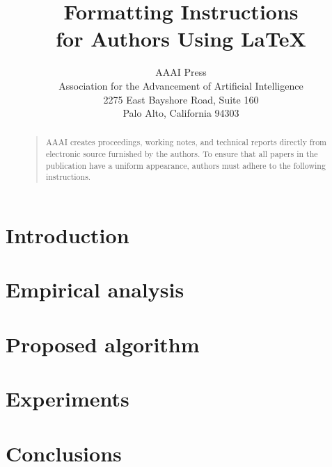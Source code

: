 \documentclass[letterpaper]{article}
\begin{document}
%
\title{Formatting Instructions \\for Authors Using \LaTeX{}}
\author{AAAI Press\\
Association for the Advancement of Artificial Intelligence\\
2275 East Bayshore Road, Suite 160\\
Palo Alto, California 94303\\
}
\maketitle
\begin{abstract}
\begin{quote}
AAAI creates proceedings, working notes, and technical reports directly from electronic source furnished by the authors. To ensure that all papers in the publication have a uniform appearance, authors must adhere to the following instructions. 
\end{quote}
\end{abstract}
\section{Introduction}

\section{Empirical analysis}

\section{Proposed algorithm}

\section{Experiments}

\section{Conclusions}


\end{document}
